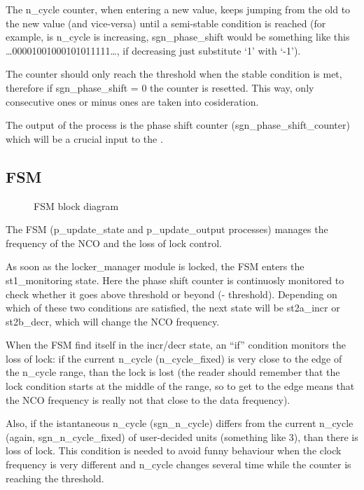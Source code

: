 \documentclass[letterpaper,10pt,english,openany,oneside]{sphinxmanual}
\begin{document}
\begin{DUlineblock}{0em}
\item[] The n\_cycle counter, when entering a new value, keeps jumping from the old to the new value (and vice-versa) until a semi-stable condition is reached (for example, is n\_cycle is increasing, sgn\_phase\_shift would be something like this …00001001000101011111…, if decreasing just substitute ‘1’ with ‘-1’).
\item[] The counter should only reach the threshold when the stable condition is met, therefore if sgn\_phase\_shift = 0 the counter is resetted. This way, only consecutive ones or minus ones are taken into cosideration.
\end{DUlineblock}

The output of the process is the phase shift counter (sgn\_phase\_shift\_counter) which will be a crucial input to the {\hyperref[\detokenize{code_explanation/phase_detector:fsm-ref}]{}}.


\subsection{FSM}
\label{\detokenize{code_explanation/phase_detector:fsm}}\label{\detokenize{code_explanation/phase_detector:fsm-ref}}
\begin{figure}[htbp]
\centering
\capstart

\noindent{}
\caption{FSM block diagram}\label{\detokenize{code_explanation/phase_detector:id5}}\end{figure}

The FSM (p\_update\_state and p\_update\_output processes) manages the frequency of the NCO and the loss of lock control.

As soon as the locker\_manager module is locked, the FSM enters the st1\_monitoring state. Here the phase shift counter is continuosly monitored to check whether it goes above threshold or beyond (- threshold). Depending on which of these two conditions are satisfied, the next state will be st2a\_incr or st2b\_decr, which will change the NCO frequency.

\begin{DUlineblock}{0em}
\item[] When the FSM find itself in the incr/decr state, an “if” condition monitors the loss of lock: if the current n\_cycle (n\_cycle\_fixed) is very close to the edge of the n\_cycle range, than the lock is lost (the reader should remember that the lock condition starts at the middle of the range, so to get to the edge means that the NCO frequency is really not that close to the data frequency).
\item[] Also, if the istantaneous n\_cycle (sgn\_n\_cycle) differs from the current n\_cycle (again, sgn\_n\_cycle\_fixed) of user-decided units (something like 3), than there is loss of lock. This condition is needed to avoid funny behaviour when the clock frequency is very different and n\_cycle changes several time while the counter is reaching the threshold.
\end{DUlineblock}



\renewcommand{\indexname}{Index}
\printindex
\end{document}
